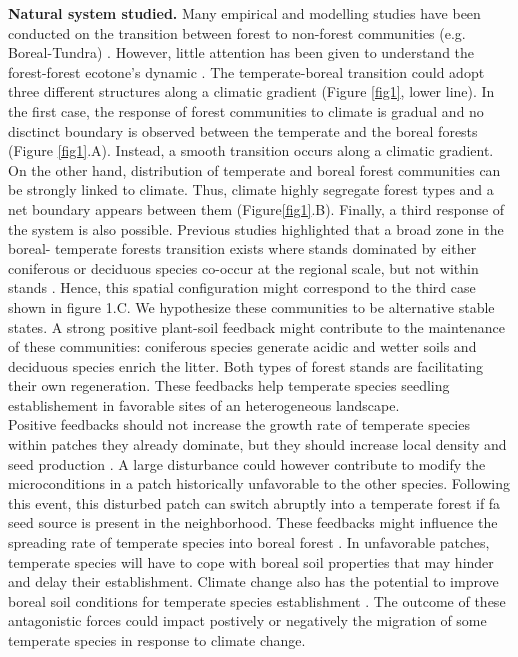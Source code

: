 \textbf{Natural system studied.} Many empirical and modelling studies have
been conducted on the transition between forest to non-forest communities
(e.g. Boreal-Tundra) \cite{Scheffer2012,Scheffer2001,Hirota2011,Messaoud2007}.
However, little attention has been given to understand the forest-forest
ecotone's dynamic \cite{Goldblum2010,Graignic2013,Messaoud2007}.  The
temperate-boreal transition could adopt three different structures along a
climatic gradient (Figure \ref{fig1}, lower line). In the first case, the
response of forest communities to climate is gradual and no disctinct boundary
is observed between the temperate and the boreal forests (Figure
\ref{fig1}.A). Instead, a smooth transition occurs along a climatic gradient.
On the other hand, distribution of temperate and boreal forest communities can
be strongly linked to climate. Thus, climate highly segregate forest types and
a net boundary appears between them (Figure\ref{fig1}.B).  Finally, a third
response  of the system is also possible. Previous studies highlighted that a
broad zone in the boreal- temperate forests transition exists where stands
dominated by either coniferous or deciduous species co-occur at the regional
scale, but not within stands \cite{Goldblum2010,Fisichelli2013}. Hence, this
spatial configuration might correspond to the third case shown in figure 1.C.
We hypothesize these communities to be alternative stable states. A strong
positive plant-soil feedback might contribute to the maintenance of these
communities: coniferous species generate acidic and wetter soils and deciduous
species enrich the litter. Both types of forest stands are facilitating their
own regeneration.   These feedbacks help temperate species seedling
establishement in favorable sites of an heterogeneous landscape.\\

Positive feedbacks should not increase the growth rate of temperate species
within patches they already dominate, but they should increase local density
and seed production \cite{Levine2006}. A large disturbance could however
contribute to modify the microconditions in a patch historically unfavorable
to the other species. Following this event, this disturbed patch can switch
abruptly into a temperate forest if fa seed source is present in the
neighborhood. These feedbacks might influence the spreading rate of temperate
species into boreal forest \cite{Levine2006}. In unfavorable patches,
temperate species will have to cope with boreal soil properties that may
hinder and delay their establishment. Climate change also has the potential to
improve boreal soil conditions for temperate species establishment
\cite{Lafleur2010}. The outcome of these antagonistic forces could impact
postively or negatively the migration of some temperate species in response to
climate change.


